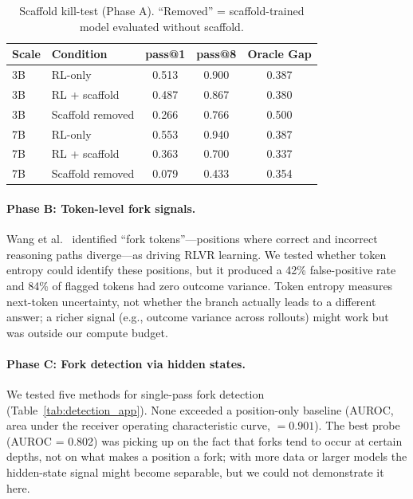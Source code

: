 \documentclass{article}
\begin{document}
\begin{table}[h]
    \centering
    \caption{Scaffold kill-test (Phase A). ``Removed'' = scaffold-trained model evaluated without scaffold.}
    \vspace{0.5em}
    \begin{tabular}{llccc}
        \toprule
        Scale & Condition & pass@1 & pass@8 & Oracle Gap \\
        \midrule
        3B & RL-only & 0.513 & 0.900 & 0.387 \\
        3B & RL + scaffold & 0.487 & 0.867 & 0.380 \\
        3B & Scaffold removed & 0.266 & 0.766 & 0.500 \\
        7B & RL-only & 0.553 & 0.940 & 0.387 \\
        7B & RL + scaffold & 0.363 & 0.700 & 0.337 \\
        7B & Scaffold removed & 0.079 & 0.433 & 0.354 \\
        \bottomrule
    \end{tabular}
    \label{tab:scaffold}
\end{table}

\paragraph{Phase B: Token-level fork signals.}
Wang et al.~\cite{wang2025beyond} identified ``fork tokens''---positions where correct and incorrect reasoning paths diverge---as driving RLVR learning.
We tested whether token entropy could identify these positions, but it produced a 42\% false-positive rate and 84\% of flagged tokens had zero outcome variance.
Token entropy measures next-token uncertainty, not whether the branch actually leads to a different answer; a richer signal (e.g., outcome variance across rollouts) might work but was outside our compute budget.

\paragraph{Phase C: Fork detection via hidden states.}
We tested five methods for single-pass fork detection (Table~\ref{tab:detection_app}).
None exceeded a position-only baseline (AUROC, area under the receiver operating characteristic curve, $= 0.901$).
The best probe (AUROC = 0.802) was picking up on the fact that forks tend to occur at certain depths, not on what makes a position a fork; with more data or larger models the hidden-state signal might become separable, but we could not demonstrate it here.
\end{document}
